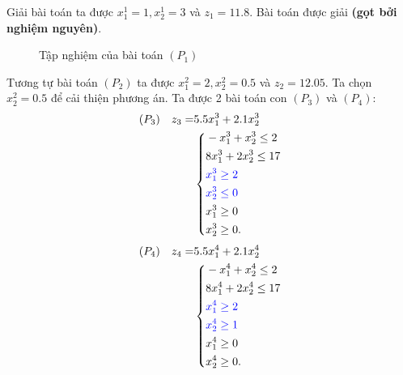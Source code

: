 \documentclass[12pt,a4paper]{report}
\begin{document}
    Giải bài toán ta được $x^1_1=1, x^1_2=3$ và $z_1=11.8$. Bài toán được giải \textbf{(gọt bởi nghiệm nguyên)}.
    \vspace{1cm}
    \begin{figure}
	\center
    \caption{Tập nghiệm của bài toán $(P_1)$}
    \end{figure}



    Tương tự bài toán $(P_2)$ ta được $x^2_1 = 2, x^2_2 = 0.5$ và $z_2=12.05$. Ta chọn $x^2_2 = 0.5$ để cải thiện phương án. Ta được 2 bài toán con $(P_3)$ và $(P_4)$:
    \begin{equation*}
        \begin{split}
            (P_3) \quad z_3= & 5.5x^3_1 + 2.1x^3_2 \\
            & \left\{\begin{split}
            & -x^3_1 + x^3_2 \leq 2 \\
            & 8x^3_1 + 2x^3_2 \leq 17 \\
            & \color{blue} x^3_1 \geq 2 \\
            & \color{blue} x^3_2 \leq 0 \\
            &x^3_1 \geq 0 \\
            &x^3_2 \geq 0. \\
            \end{split}\right. \\
        \end{split}
    \end{equation*}
   \begin{equation*}
        \begin{split}
            (P_4) \quad z_4= & 5.5x^4_1 + 2.1x^4_2  \\
            & \left\{\begin{split}
            & -x^4_1 + x^4_2 \leq 2 \\
            & 8x^4_1 + 2x^4_2 \leq 17 \\
            & \color{blue} x^4_1 \geq 2 \\
            & \color{blue} x^4_2 \geq 1 \\
            &x^4_1 \geq 0 \\
            &x^4_2 \geq 0. \\
            \end{split}\right. \\
        \end{split}
    \end{equation*}
\end{document}
